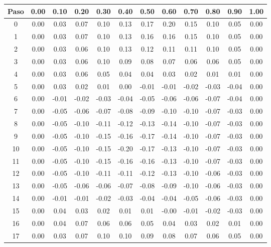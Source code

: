 \documentclass[11pt]{article}
\begin{document}
\begin{table}
\center
\begin{small}
\begin{tabular}{ c c c c c c c c c c c c }
\hline
Paso & 0.00 & 0.10 & 0.20 & 0.30 & 0.40 & 0.50 & 0.60 & 0.70 & 0.80 & 0.90 & 1.00 \\
\hline
\hline
0 & 0.00 & 0.03 & 0.07 & 0.10 & 0.13 & 0.17 & 0.20 & 0.15 & 0.10 & 0.05 & 0.00 \\
1 & 0.00 & 0.03 & 0.07 & 0.10 & 0.13 & 0.16 & 0.16 & 0.15 & 0.10 & 0.05 & 0.00 \\
2 & 0.00 & 0.03 & 0.06 & 0.10 & 0.13 & 0.12 & 0.11 & 0.11 & 0.10 & 0.05 & 0.00 \\
3 & 0.00 & 0.03 & 0.06 & 0.10 & 0.09 & 0.08 & 0.07 & 0.06 & 0.06 & 0.05 & 0.00 \\
4 & 0.00 & 0.03 & 0.06 & 0.05 & 0.04 & 0.04 & 0.03 & 0.02 & 0.01 & 0.01 & 0.00 \\
5 & 0.00 & 0.03 & 0.02 & 0.01 & 0.00 & -0.01 & -0.01 & -0.02 & -0.03 & -0.04 & 0.00 \\
6 & 0.00 & -0.01 & -0.02 & -0.03 & -0.04 & -0.05 & -0.06 & -0.06 & -0.07 & -0.04 & 0.00 \\
7 & 0.00 & -0.05 & -0.06 & -0.07 & -0.08 & -0.09 & -0.10 & -0.10 & -0.07 & -0.03 & 0.00 \\
8 & 0.00 & -0.05 & -0.10 & -0.11 & -0.12 & -0.13 & -0.14 & -0.10 & -0.07 & -0.03 & 0.00 \\
9 & 0.00 & -0.05 & -0.10 & -0.15 & -0.16 & -0.17 & -0.14 & -0.10 & -0.07 & -0.03 & 0.00 \\
10 & 0.00 & -0.05 & -0.10 & -0.15 & -0.20 & -0.17 & -0.13 & -0.10 & -0.07 & -0.03 & 0.00 \\
11 & 0.00 & -0.05 & -0.10 & -0.15 & -0.16 & -0.16 & -0.13 & -0.10 & -0.07 & -0.03 & 0.00 \\
12 & 0.00 & -0.05 & -0.10 & -0.11 & -0.11 & -0.12 & -0.13 & -0.10 & -0.06 & -0.03 & 0.00 \\
13 & 0.00 & -0.05 & -0.06 & -0.06 & -0.07 & -0.08 & -0.09 & -0.10 & -0.06 & -0.03 & 0.00 \\
14 & 0.00 & -0.01 & -0.01 & -0.02 & -0.03 & -0.04 & -0.04 & -0.05 & -0.06 & -0.03 & 0.00 \\
15 & 0.00 & 0.04 & 0.03 & 0.02 & 0.01 & 0.01 & -0.00 & -0.01 & -0.02 & -0.03 & 0.00 \\
16 & 0.00 & 0.04 & 0.07 & 0.06 & 0.06 & 0.05 & 0.04 & 0.03 & 0.02 & 0.01 & 0.00 \\
17 & 0.00 & 0.03 & 0.07 & 0.10 & 0.10 & 0.09 & 0.08 & 0.07 & 0.06 & 0.05 & 0.00 \\

\end{tabular}
\end{small}
\end{table}
\end{document}

